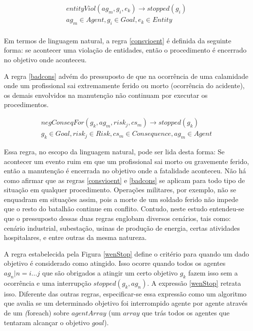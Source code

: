 \begin{eqnarray}\label{consvioent}
	entityViol(ag_m,g_i,e_k) \to stopped(g_i) \nonumber \\  
    ag_m \in Agent, g_i \in Goal, e_k \in Entity \\ \nonumber
\end{eqnarray}

Em termos de linguagem natural, a regra \ref{consvioent} é definida da seguinte forma: se acontecer uma violação de entidades, então o procedimento é encerrado no objetivo onde aconteceu. 

A regra \ref{badcons} advém do pressuposto de que na ocorrência de uma calamidade onde um profissional sai extremamente ferido ou morto (ocorrência do acidente), os demais envolvidos na manutenção não continuam por executar os procedimentos. 
 
 \begin{eqnarray}\label{badcons}
	negConseqFor(g_k,ag_m,risk_j,cs_m) \to stopped(g_k) \nonumber \\ 
    g_k \in Goal, risk_j \in Risk, cs_m \in Consequence, ag_m \in Agent
\end{eqnarray}

Essa regra, no escopo da linguagem natural, pode ser lida desta forma: Se acontecer um evento ruim em que um profissional sai morto ou gravemente ferido, então a manutenção é encerrada no objetivo onde a fatalidade aconteceu. Não há como afirmar que as regras  \ref{consvioent} e \ref{badcons} se aplicam para todo tipo de situação em qualquer procedimento. Operações militares, por exemplo, não se enquadram em situações assim, pois a morte de um soldado ferido não impede que o resto do batalhão continue em conflito. Contudo, neste estudo entendeu-se que o pressuposto dessas duas regras englobam diversos cenários, tais como: cenário industrial, subestação, usinas de produção de energia, certas atividades hospitalares, e entre outras da mesma natureza.  

A regra estabelecida pela Figura \ref{wenStop} define o critério para quando um dado objetivo é considerado como atingido. Isso ocorre quando todos os agentes $ag_n | n = i ... j$ que são obrigados a atingir um certo objetivo $ g_k $ fazem isso sem a ocorrência e uma interrupção $stopped(g_k,ag_n)$. A expressão \ref{wenStop} retrata isso. Diferente das outras regras, especificar-se essa expressão como um algoritmo que avalia se um determinado objetivo foi interrompido agente por agente através de um \textit(foreach) sobre $agentArray$ (um $array$ que trás todos os agentes que tentaram alcançar o objetivo $goal$). 


